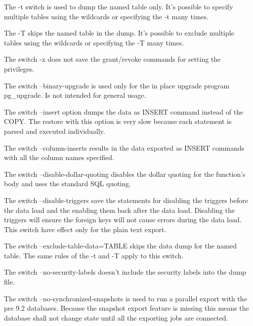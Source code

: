 The -t switch is used to dump the named table only. It's possible to specify multiple tables using 
the wildcards or specifying the -t many times.\newline

The -T skips the named table in the dump. It's possible to exclude multiple tables using 
the wildcards or specifying the -T many times.\newline

The switch -x does not save the grant/revoke commands for setting the privileges.\newline

The switch --binary-upgrade is used only for the in place upgrade program pg\_upgrade. Is not intended for 
general usage. 

The switch --insert option dumps the data as INSERT command instead of the COPY. The restore with this 
option is very slow because each statement is parsed and executed individually.\newline

The switch --column-inserts results in the data exported as INSERT commands with all the column 
names specified.\newline

The switch --disable-dollar-quoting disables the dollar quoting for the function's body and uses the 
standard SQL quoting.\newline

The switch --disable-triggers save the statements for disabling  the triggers before the data load and the 
enabling them back after the data load. Disabling the triggers will ensure the foreign keys will not cause 
errors during the data load. This switch have effect only for the plain text export.\newline

The switch --exclude-table-data=TABLE skips the data dump for the named table. The same rules of the -t and 
-T apply to this switch.\newline


The switch --no-security-labels doesn't include the security labels into the dump file.\newline

The switch --no-synchronized-snapshots  is used to run a parallel export with the pre 9.2 
databases. Because the snapshot export feature is missing this means the database shall not change 
state until all the exporting jobs are connected.\newline

